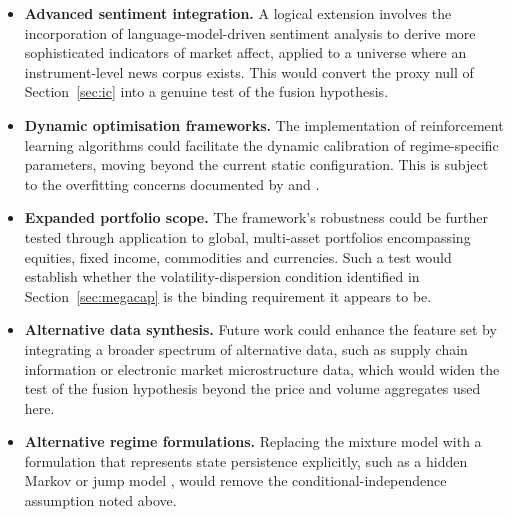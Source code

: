 \begin{itemize}
\item \textbf{Advanced sentiment integration.} A logical extension involves the
incorporation of language-model-driven sentiment analysis to derive more sophisticated
indicators of market affect, applied to a universe where an instrument-level news corpus
exists. This would convert the proxy null of Section~\ref{sec:ic} into a genuine test of
the fusion hypothesis.
\item \textbf{Dynamic optimisation frameworks.} The implementation of reinforcement
learning algorithms could facilitate the dynamic calibration of regime-specific
parameters, moving beyond the current static configuration. This is subject to the
overfitting concerns documented by \citet{harvey15} and \citet{prado16}.
\item \textbf{Expanded portfolio scope.} The framework's robustness could be further
tested through application to global, multi-asset portfolios encompassing equities, fixed
income, commodities and currencies. Such a test would establish whether the
volatility-dispersion condition identified in Section~\ref{sec:megacap} is the binding
requirement it appears to be.
\item \textbf{Alternative data synthesis.} Future work could enhance the feature set by
integrating a broader spectrum of alternative data, such as supply chain information or
electronic market microstructure data, which would widen the test of the fusion hypothesis
beyond the price and volume aggregates used here.
\item \textbf{Alternative regime formulations.} Replacing the mixture model with a
formulation that represents state persistence explicitly, such as a hidden Markov or jump
model \citep{li25,luo26}, would remove the conditional-independence assumption noted
above.
\end{itemize}
